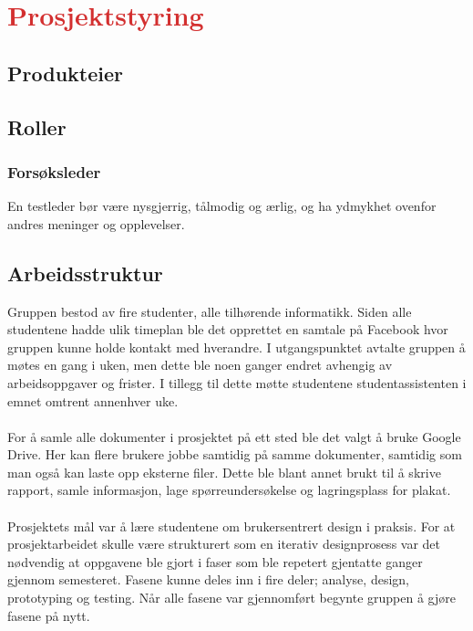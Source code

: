 \section{\textcolor[HTML]{D32F2F}{Prosjektstyring}}

\subsection{Produkteier}

\subsection{Roller}
\subsubsection{Forsøksleder}
En testleder bør være nysgjerrig, tålmodig og ærlig, og ha ydmykhet ovenfor andres meninger og opplevelser\cite{brukskvalitetstesting}.

\subsection{Arbeidsstruktur}
Gruppen bestod av fire studenter, alle tilhørende informatikk. Siden alle studentene hadde ulik timeplan ble det opprettet en samtale på Facebook hvor gruppen kunne holde kontakt med hverandre. I utgangspunktet avtalte gruppen å møtes en gang i uken, men dette ble noen ganger endret avhengig av arbeidsoppgaver og frister. I tillegg til dette møtte studentene studentassistenten i emnet omtrent annenhver uke. 
\\\\
For å samle alle dokumenter i prosjektet på ett sted ble det valgt å bruke Google Drive. Her kan flere brukere jobbe samtidig på samme dokumenter, samtidig som man også kan laste opp eksterne filer. Dette ble blant annet brukt til å skrive rapport, samle informasjon, lage spørreundersøkelse og lagringsplass for plakat. 
\\\\
Prosjektets mål var å lære studentene om brukersentrert design i praksis. For at prosjektarbeidet skulle være strukturert som en iterativ designprosess var det nødvendig at oppgavene ble gjort i faser som ble repetert gjentatte ganger gjennom semesteret. Fasene kunne deles inn i fire deler; analyse, design, prototyping og testing. Når alle fasene var gjennomført begynte gruppen å gjøre fasene på nytt. 

